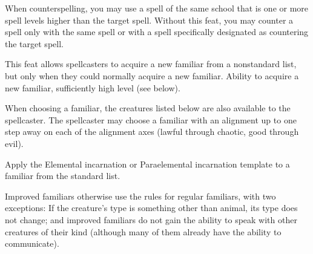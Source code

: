 {}{}
{When counterspelling, you may use a spell of the same school that is one or more spell levels higher than the target spell.}
{Without this feat, you may counter a spell only with the same spell or with a spell specifically designated as countering the target spell.}{}

{This feat allows spellcasters to acquire a new familiar from a nonstandard list, but only when they could normally acquire a new familiar.}
{Ability to acquire a new familiar, sufficiently high level (see below).}
{When choosing a familiar, the creatures listed below are also available to the spellcaster. The spellcaster may choose a familiar with an alignment up to one step away on each of the alignment axes (lawful through chaotic, good through evil).


Apply the Elemental incarnation or Paraelemental incarnation template to a familiar from the standard list.

Improved familiars otherwise use the rules for regular familiars, with two exceptions: If the creature's type is something other than animal, its type does not change; and improved familiars do not gain the ability to speak with other creatures of their kind (although many of them already have the ability to communicate).}{}{}

